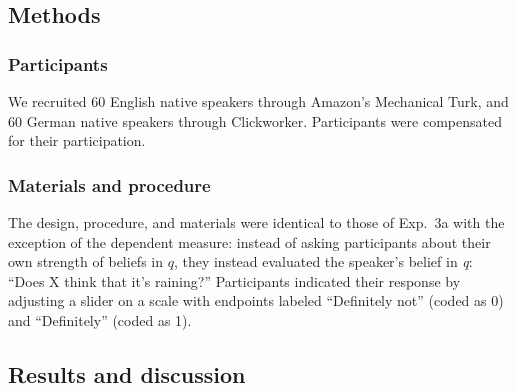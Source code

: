 \documentclass[11pt]{article}
\begin{document}
\subsection{Methods}

\subsubsection{Participants}

We recruited 60 English native speakers through Amazon's Mechanical Turk, and 60 German native speakers through Clickworker. Participants were compensated for their participation.

\subsubsection{Materials and procedure}

The design, procedure, and materials were identical to those of Exp.~3a with the exception of the dependent measure: instead of asking participants about their own strength of beliefs in $q$, they instead evaluated the speaker's belief in \emph{q}: ``Does X think that it's raining?'' Participants indicated their response by adjusting a slider on a scale with endpoints labeled ``Definitely not'' (coded as 0) and ``Definitely'' (coded as 1). 

\subsection{Results and discussion}
\end{document}

